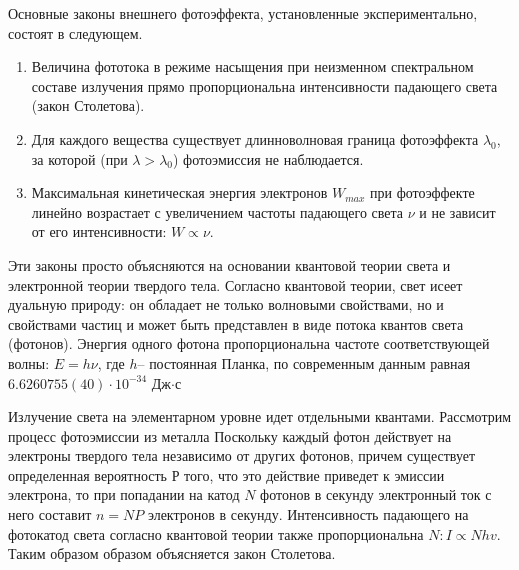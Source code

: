 Основные законы внешнего фотоэффекта, установленные экспериментально, состоят в следующем.
\begin{enumerate}
 	\item Величина фототока в режиме насыщения при неизменном спектральном составе излучения прямо пропорциональна интенсивности падающего света (закон Столетова).
	 \item Для каждого вещества существует длинноволновая граница фотоэффекта $\lambda_0$, за которой (при $\lambda>\lambda_0$) фотоэмиссия не наблюдается.
	 \item Максимальная кинетическая энергия электронов $W_{max}$ при фотоэффекте линейно возрастает с увеличением частоты падающего света $\nu$ и не зависит от его интенсивности: $W\propto \nu$.
\end{enumerate}

Эти законы просто объясняются на основании квантовой теории света и электронной теории твердого тела. Согласно квантовой теории, свет исеет дуальную природу: он обладает не только волновыми свойствами, но и свойствами частиц и может быть представлен в виде потока квантов света (фотонов). Энергия одного фотона пропорциональна частоте соответствующей волны: $E=h \nu$, где $h$-- постоянная Планка, по современным данным равная $6.6260755(40)\cdot10^{-34}$ Дж$\cdot$с

Излучение света на элементарном уровне идет отдельными квантами. Рассмотрим процесс фотоэмиссии из металла Поскольку каждый фотон действует на электроны твердого тела независимо от других фотонов, причем существует определенная вероятность $Р$ того, что это действие приведет к эмиссии электрона, то при попадании на катод $N$ фотонов в секунду электронный ток с него составит $n=NP$ электронов в секунду. Интенсивность падающего на фотокатод света согласно квантовой теории также пропорциональна $N: I\propto Nhv$. Таким образом образом объясняется закон Столетова.


